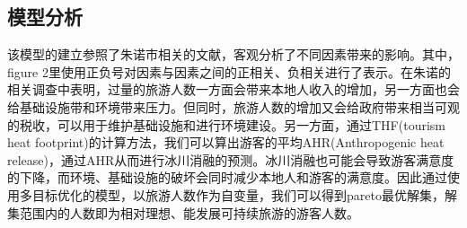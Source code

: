 \documentclass[12pt]{article}  %
\begin{document}
 \subsection{模型分析}
 该模型的建立参照了朱诺市相关的文献，客观分析了不同因素带来的影响。其中，figure 2里使用正负号对因素与因素之间的正相关、负相关进行了表示。在朱诺的相关调查中表明，过量的旅游人数一方面会带来本地人收入的增加，另一方面也会给基础设施带和环境带来压力。但同时，旅游人数的增加又会给政府带来相当可观的税收，可以用于维护基础设施和进行环境建设。另一方面，通过THF(tourism heat footprint)的计算方法，我们可以算出游客的平均AHR(Anthropogenic heat release)，通过AHR从而进行冰川消融的预测。冰川消融也可能会导致游客满意度的下降，而环境、基础设施的破坏会同时减少本地人和游客的满意度。因此通过使用多目标优化的模型，以旅游人数作为自变量，我们可以得到pareto最优解集，解集范围内的人数即为相对理想、能发展可持续旅游的游客人数。
\end{document}
